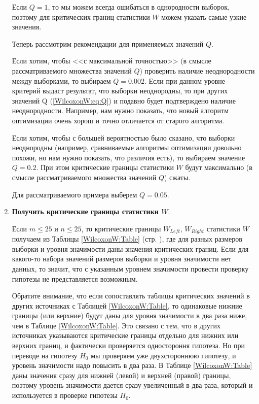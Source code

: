 \documentclass[a4paper,12pt]{article}
\begin{document}
\begin{enumerate}
Если $Q=1$, то мы можем всегда ошибаться в однородности выборок, поэтому для критических границ статистики $W$ можем указать самые узкие значения.

Теперь рассмотрим рекомендации для применяемых значений $Q$.  

Если хотим, чтобы <<с максимальной точностью>> (в смысле рассматриваемого множества значений $Q$) проверить наличие неоднородности между выборками, то выбираем $Q = 0.002$. Если при данном уровне критерий выдаст результат, что выборки неоднородны, то при других значений Q (\ref{WilcoxonW:eq:Q}) и подавно будет подтверждено наличие неоднородности.  Например, нам нужно показать, что новый алгоритм оптимизации очень хорош и точно отличается от старого алгоритма.

Если хотим, чтобы с большей вероятностью было сказано, что выборки неоднородны (например, сравниваемые алгоритмы оптимизации довольно похожи, но нам нужно показать, что различия есть), то выбираем значение $Q = 0.2$. При этом критические границы статистики $W$ будут максимально (в смысле рассматриваемого множества значений $Q$) сжаты.

Для рассматриваемого примера выберем $ Q=0.05 $.

\item \textbf{Получить критические границы статистики $W$}.

Если $m\leq 25$ и $n\leq 25$, то критические границы $W_{Left}$, $W_{Right}$ статистики $W$ получаем из Таблицы \ref{WilcoxonW:Table} (стр. \pageref{WilcoxonW:section_table}), где для разных размеров выборки и уровня значимости даны значения критических границ. Если для какого-то набора значений размеров выборки и уровня значимости нет данных, то значит, что с указанным уровнем значимости провести проверку гипотезы не представляется возможным.

Обратите внимание, что если сопоставлять таблицы критических значений в других источниках с Таблицей \ref{WilcoxonW:Table}, то одинаковые нижние границы (или верхние) будут даны для уровня значимости в два раза ниже, чем в Таблице \ref{WilcoxonW:Table}. Это связано с тем, что в других источниках указываются критические границы отдельно для нижних или верхних границ, и фактически проверяется одностороння гипотеза. Но при переводе на гипотезу $ H_0 $ мы проверяем уже двухстороннюю гипотезу, и уровень значимости надо повысить в два раза. В Таблице \ref{WilcoxonW:Table} даны значения сразу для нижней (левой) и верхней (правой) границы, поэтому уровень значимости дается сразу увеличенный в два раза, который и используется в проверке гипотезы $ H_0 $.


\end{enumerate}
\end{document}
